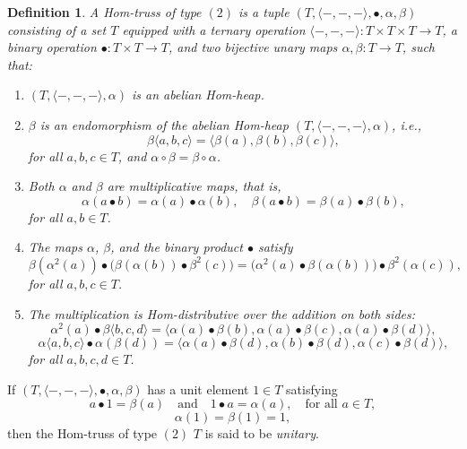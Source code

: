\documentclass[14pt]{article}
\theoremstyle{Definition}
\newtheorem{Def}[thm]{Definition}
\theoremstyle{remark}
\begin{document}
\begin{Def}
A \emph{Hom-truss of type $(2)$} is a tuple $(T,\langle-,-,-\rangle,\bullet,\alpha,\beta)$ consisting of a set $T$ equipped with a ternary operation $\langle-,-,-\rangle:T\times T\times T\rightarrow T$, a binary operation $\bullet:T\times T\rightarrow T$, and two bijective unary maps $\alpha,\beta:T\rightarrow T$, such that:
\begin{enumerate}
\item[1.] $(T,\langle-,-,-\rangle,\alpha)$ is an abelian Hom-heap.
\item[2.] $\beta$ is an endomorphism of the abelian Hom-heap $(T,\langle-,-,-\rangle,\alpha)$, i.e.,
\[
\beta\langle a,b,c\rangle=\langle\beta(a),\beta(b),\beta(c)\rangle,
\]
for all $a,b,c\in T$, and $\alpha\circ \beta=\beta\circ \alpha$.
\item[3.] Both $\alpha$ and $\beta$ are multiplicative maps, that is,
\[
\alpha(a\bullet b)=\alpha(a)\bullet \alpha(b),\quad \beta(a\bullet b)=\beta(a)\bullet \beta(b),
\]
for all $a,b\in T$.
\item[4.] The maps $\alpha$, $\beta$, and the binary product $\bullet$ satisfy
\begin{equation}\label{eq6}
\beta(\alpha^{2}(a))\bullet\big(\beta(\alpha(b))\bullet \beta^{2}(c)\big)
= \big(\alpha^{2}(a)\bullet \beta(\alpha(b))\big)\bullet \beta^{2}(\alpha(c)),
\end{equation}
for all $a,b,c\in T$.
\item[5.] The multiplication is Hom-distributive over the addition on both sides:
\begin{equation}\label{eq7}
\alpha^{2}(a)\bullet\beta\langle b,c,d\rangle
= \langle \alpha(a)\bullet\beta(b),\alpha(a)\bullet\beta(c),\alpha(a)\bullet\beta(d) \rangle,
\end{equation}
\begin{equation}\label{eq8}
\alpha\langle a,b,c\rangle\bullet\alpha(\beta(d))
= \langle \alpha(a)\bullet\beta(d),\alpha(b)\bullet\beta(d),\alpha(c)\bullet\beta(d) \rangle,
\end{equation}
for all $a,b,c,d\in T$.
\end{enumerate}
\end{Def}

If $(T,\langle-,-,-\rangle,\bullet,\alpha,\beta)$ has a unit element $1\in T$ satisfying
\begin{equation}\label{eq9}
a\bullet 1=\beta(a) \quad\text{and}\quad 1\bullet a=\alpha(a),\quad \text{for all } a\in T,
\end{equation}
\begin{equation}\label{eq10}
\alpha(1)=\beta(1)=1,
\end{equation}
then the Hom-truss of type $(2)$ $T$ is said to be \emph{unitary}.
\end{document}
